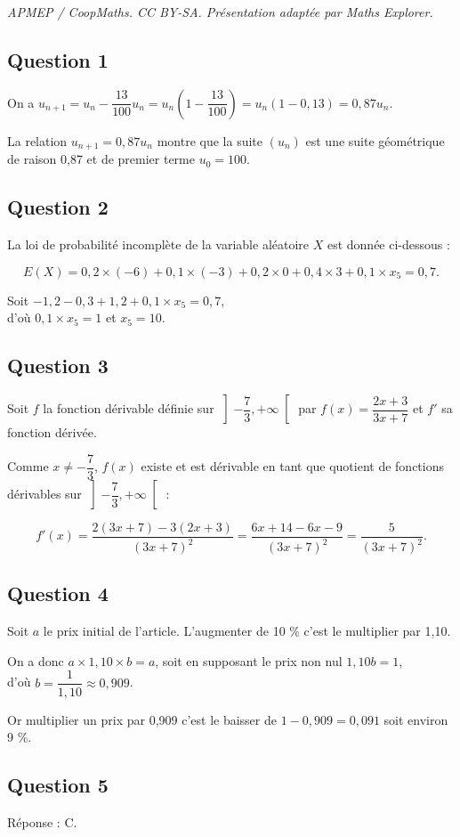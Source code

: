 \documentclass[10pt]{article}
\begin{document}
\noindent\textit{APMEP / CoopMaths. CC BY-SA. Présentation adaptée par Maths Explorer.}\par\medskip
\subsection*{Question 1}
	
	On a \(u_{n+1} = u_n - \dfrac{13}{100} u_n = u_n \left(1 - \dfrac{13}{100}\right) = u_n (1 - 0,13) = 0,87 u_n\).
	
	La relation \(u_{n+1} = 0,87 u_n\) montre que la suite \((u_n)\) est une suite géométrique de raison 0,87 et de premier terme \(u_0 = 100\).
	
	\subsection*{Question 2}
	
	La loi de probabilité incomplète de la variable aléatoire \(X\) est donnée ci-dessous :
	
	\[
	E(X) = 0,2 \times (-6) + 0,1 \times (-3) + 0,2 \times 0 + 0,4 \times 3 + 0,1 \times x_5 = 0,7.
	\]
	
	Soit \(-1,2 - 0,3 + 1,2 + 0,1 \times x_5 = 0,7\),\\ d’où \(0,1 \times x_5 = 1\) et \(x_5 = 10\).
	
	\subsection*{Question 3}
	
	Soit \(f\) la fonction dérivable définie sur \(\left] -\dfrac{7}{3}, +\infty \right[\) par \(f(x) = \dfrac{2x + 3}{3x + 7}\) et \(f'\) sa fonction dérivée.
	
	Comme \(x \neq -\dfrac{7}{3}\), \(f(x)\) existe et est dérivable en tant que quotient de fonctions dérivables sur \(\left] -\dfrac{7}{3}, +\infty \right[\) :
	
	\[
	f'(x) = \dfrac{2(3x + 7) - 3(2x + 3)}{(3x + 7)^2} = \dfrac{6x + 14 - 6x - 9}{(3x + 7)^2} = \dfrac{5}{(3x + 7)^2}.
	\]
	
	\subsection*{Question 4}
	
	Soit \(a\) le prix initial de l’article. L’augmenter de 10 \% c’est le multiplier par 1,10.
	
	On a donc \(a \times 1,10 \times b = a\), soit en supposant le prix non nul \(1,10b = 1\),\\ d’où \(b = \dfrac{1}{1,10} \approx 0,909\).
	
	Or multiplier un prix par 0,909 c’est le baisser de \(1 - 0,909 = 0,091\) soit environ 9 \%.
	
	\subsection*{Question 5}
	
	Réponse : C.
\end{document}
